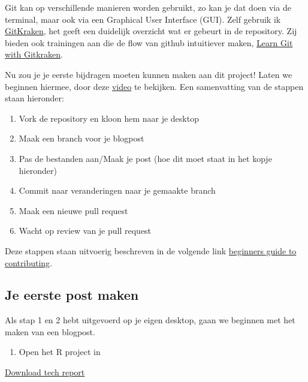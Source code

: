 \documentclass[]{article}
\providecommand{\tightlist}{%
  \setlength{\itemsep}{0pt}\setlength{\parskip}{0pt}}
\begin{document}
Git kan op verschillende manieren worden gebruikt, zo kan je dat doen
via de terminal, maar ook via een Graphical User Interface (GUI). Zelf
gebruik ik \href{https://www.gitkraken.com/}{GitKraken}, het geeft een
duidelijk overzicht wat er gebeurt in de repository. Zij bieden ook
trainingen aan die de flow van github intuitiever maken,
\href{https://www.gitkraken.com/learn-git}{Learn Git with Gitkraken}.

Nu zou je je eerste bijdragen moeten kunnen maken aan dit project! Laten
we beginnen hiermee, door deze
\href{https://www.youtube.com/watch?v=j_qpzND5yAg}{video} te bekijken.
Een samenvatting van de stappen staan hieronder:

\begin{enumerate}
\def\labelenumi{\arabic{enumi}.}
\tightlist
\item
  Vork de repository en kloon hem naar je desktop
\item
  Maak een branch voor je blogpost
\item
  Pas de bestanden aan/Maak je post (hoe dit moet staat in het kopje
  hieronder)
\item
  Commit naar veranderingen naar je gemaakte branch
\item
  Maak een nieuwe pull request
\item
  Wacht op review van je pull request
\end{enumerate}

Deze stappen staan uitvoerig beschreven in de volgende link
\href{https://akrabat.com/the-beginners-guide-to-contributing-to-a-github-project/}{beginners
guide to contributing}.

\hypertarget{je-eerste-post-maken}{%
\subsection{Je eerste post maken}\label{je-eerste-post-maken}}

Als stap 1 en 2 hebt uitgevoerd op je eigen desktop, gaan we beginnen
met het maken van een blogpost.

\begin{enumerate}
\def\labelenumi{\arabic{enumi}.}
\tightlist
\item
  Open het R project in
\end{enumerate}

\href{report.pdf}{Download tech report}
\end{document}
